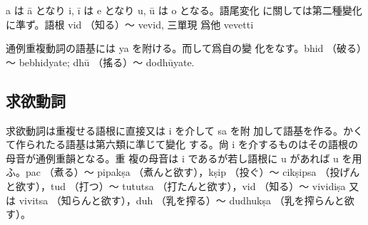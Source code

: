 a は ā となり i, ī は e となり u, ū は o となる。語尾変化
に關しては第二種變化に準ず。語根 vid （知る）～ vevid, 三單現
爲他 vevetti

\numberParagraph
通例重複動詞の語基には ya を附ける。而して爲自の變
化をなす。bhid （破る）～ bebhidyate; dhū （搖る）～ dodhūyate.

\subsection{求欲動詞}
\numberParagraph
求欲動詞は重複せる語根に直接又は i を介して sa を附
加して語基を作る。かくて作られたる語基は第六類に準じて變化
する。尙 i を介するものはその語根の母音が通例重韻となる。重
複の母音は i であるが若し語根に u があれば u を用ふ。pac
（煮る）～ pipakṣa （煮んと欲す），kṣip （投ぐ）～ cikṣipsa （投げん
と欲す），tud （打つ）～ tututsa （打たんと欲す），vid （知る）～
vividiṣa 又は vivitsa （知らんと欲す），duh （乳を搾る）～
dudhukṣa （乳を搾らんと欲す）。

